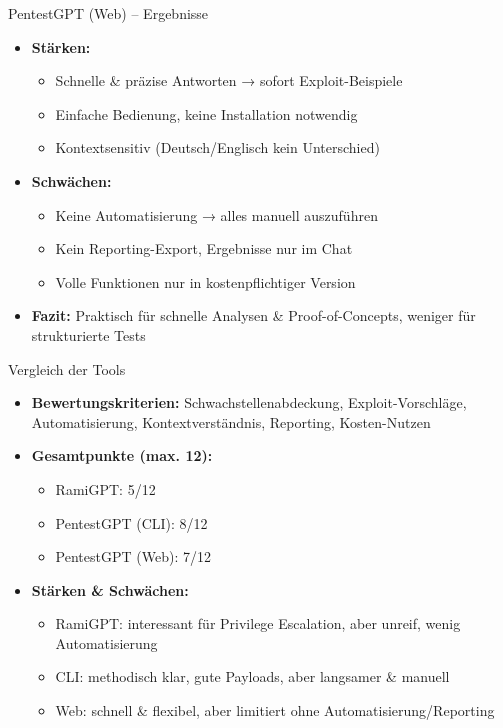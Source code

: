 \documentclass[
	aspectratio=169,	%
	onlytextwidth,		%
	t,					%
	]{beamer}
\begin{document}
\begin{frame}{PentestGPT (Web) – Ergebnisse}
	\begin{itemize}
		\item \textbf{Stärken:}
		\begin{itemize}
			\item Schnelle \& präzise Antworten → sofort Exploit-Beispiele
			\item Einfache Bedienung, keine Installation notwendig
			\item Kontextsensitiv (Deutsch/Englisch kein Unterschied)
		\end{itemize}
		
		\item \textbf{Schwächen:}
		\begin{itemize}
			\item Keine Automatisierung → alles manuell auszuführen
			\item Kein Reporting-Export, Ergebnisse nur im Chat
			\item Volle Funktionen nur in kostenpflichtiger Version
		\end{itemize}
		
		\item \textbf{Fazit:}  
		Praktisch für schnelle Analysen \& Proof-of-Concepts, weniger für strukturierte Tests
	\end{itemize}
\end{frame}

\begin{frame}{Vergleich der Tools}
	\begin{itemize}
		\item \textbf{Bewertungskriterien:}  
		Schwachstellenabdeckung, Exploit-Vorschläge, Automatisierung, Kontextverständnis, Reporting, Kosten-Nutzen
		
		\item \textbf{Gesamtpunkte (max. 12):}
		\begin{itemize}
			\item RamiGPT: 5/12
			\item PentestGPT (CLI): 8/12
			\item PentestGPT (Web): 7/12
		\end{itemize}
		
		\item \textbf{Stärken \& Schwächen:}
		\begin{itemize}
			\item RamiGPT: interessant für Privilege Escalation, aber unreif, wenig Automatisierung
			\item CLI: methodisch klar, gute Payloads, aber langsamer \& manuell
			\item Web: schnell \& flexibel, aber limitiert ohne Automatisierung/Reporting
		\end{itemize}
	\end{itemize}
\end{frame}
\end{document}
